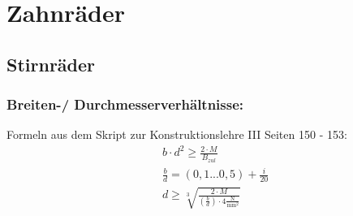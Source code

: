 \section{Zahnräder}
\subsection{Stirnräder}
\subsubsection{Breiten-/ Durchmesserverhältnisse:}
Formeln aus dem Skript zur Konstruktionslehre III Seiten 150 - 153:
\begin{align*}
&b \cdot d^2 \ge\frac{2 \cdot M}{B_{zul}} \\
&\frac{b}{d} = (0,1...0,5) + \frac{i}{20} \\
&d \ge \sqrt[3]{\frac{2 \cdot M}{( \frac{b}{d}) \cdot  4 \frac{\text{N}}{\text{mm}^2}}}
\end{align*}
